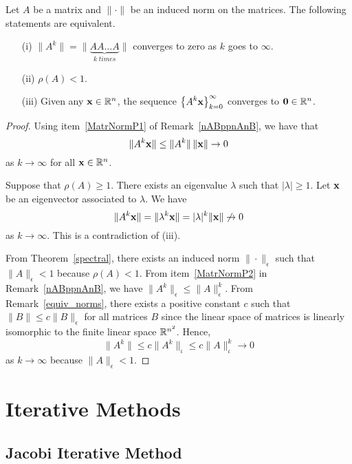 \begin{theorem} \label{spect}
Let $A$ be a \nn matrix and $\|\cdot\|$ be an induced norm 
on the \nn matrices.  The following statements are
equivalent.
\begin{itemize}
\item [(i)]
$\displaystyle \| A^k \| = \|\underbrace{ A A \ldots A}_{k\;times} \|$
converges to zero as $k$ goes to $\infty$.
\item [(ii)] $\rho (A) < 1$.
\item [(iii)] Given any $\mathbf{x} \in \mathbb{R}^n$, the sequence
$\displaystyle \left\{ A^k \mathbf{x}\right\}_{k=0}^\infty$ converges to
$\mathbf{0} \in \mathbb{R}^n$.
\end{itemize}
\end{theorem}

\begin{proof}
Using item~\ref{MatrNormP1} of Remark~\ref{nABppnAnB}, we have that
\[
\|A^k \mathbf{x} \| \leq \|A^k\|\, \|\mathbf{x} \| \rightarrow 0
\]
as $k\rightarrow \infty$ for all $\mathbf{x}\in \mathbb{R}^n$.

  Suppose that $\rho(A) \geq 1$.
There exists an eigenvalue $\lambda$ such that $|\lambda|\geq 1$.
Let $\mathbf{x}$ be an eigenvector associated to $\lambda$.
We have
\[
\| A^k\mathbf{x} \| = \| \lambda^k \mathbf{x} \| = |\lambda|^k \|\mathbf{x}\|
\not\rightarrow 0
\]
as $k\rightarrow \infty$.  This is a contradiction of (iii).

 From Theorem~\ref{spectral}, there
exists an induced norm $\|\cdot\|_\epsilon$ such that
$\|A\|_\epsilon < 1$ because $\rho(A) < 1$.  From
item~\ref{MatrNormP2} in Remark~\ref{nABppnAnB}, we have
$\displaystyle \|A^k\|_\epsilon \leq \|A\|_\epsilon^k$.
From Remark~\ref{equiv_norms}, there exists
a positive constant $c$ such that $\|B\| \leq c \|B\|_\epsilon$ for
all \nn matrices $B$ since the linear space of \nn matrices is
linearly isomorphic to the finite linear space $\mathbb{R}^{n^2}$.  Hence,
\[
\|A^k\| \leq c\|A^k\|_\iota \leq c \|A\|_\iota^k \rightarrow 0
\]
as $k\rightarrow \infty$ because $\|A\|_\epsilon < 1$.
\end{proof}

\section{Iterative Methods}

\subsection{Jacobi Iterative Method}

